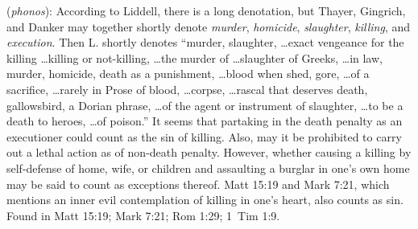 \item[Killing,]

(\textit{phonos}):
According to Liddell, there is a long denotation, but Thayer, Gingrich, and Danker may together shortly denote \emph{murder}, \emph{homicide}, \emph{slaughter}, \emph{killing}, and \emph{execution}. Then L. shortly denotes ``murder, slaughter, \ldots exact vengeance for the killing \ldots killing or not-killing, \ldots the murder of \ldots slaughter of Greeks, \ldots in law, murder, homicide, death as a punishment, \ldots blood when shed, gore, \ldots of a sacrifice, \ldots rarely in Prose of blood, \ldots corpse, \ldots rascal that deserves death, gallowsbird, a Dorian phrase, \ldots of the agent or instrument of slaughter, \ldots to be a death to heroes, \ldots of poison.'' It seems that partaking in the death penalty as an executioner could count as the sin of killing. Also, may it be prohibited to carry out a lethal action as of non-death penalty. However, whether causing a killing by self-defense of home, wife, or children and assaulting a burglar in one's own home may be said to count as exceptions thereof. Matt 15:19 and Mark 7:21, which mentions an inner evil contemplation of killing in one's heart, also counts as sin.
Found in Matt 15:19; Mark 7:21; Rom 1:29; 1~Tim 1:9.
